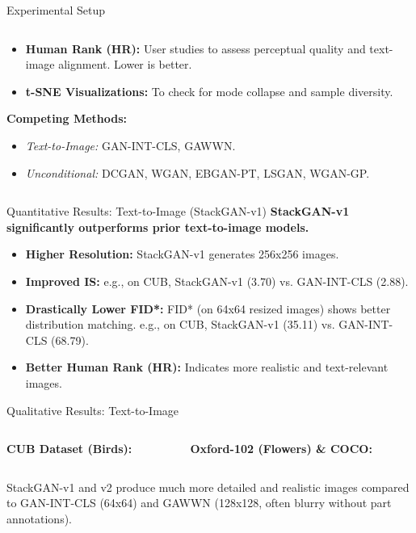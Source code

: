 \documentclass{beamer}
\newcommand{\paperfigure}[3][width=\textwidth]{%
    \begin{figure}%
        \centering%
        \texttt{[image: figures/\#2.png]}%
        \caption{#3 (Source:~\cite{stackgan++})}%
    \end{figure}%
}
\begin{document}
\begin{frame}{Experimental Setup}
\begin{columns}[T]
\begin{column}{0.5\textwidth}
\begin{itemize}
                \item \textbf{Human Rank (HR):} User studies to assess perceptual quality and text-image alignment. Lower is better.
                \item \textbf{t-SNE Visualizations:} To check for mode collapse and sample diversity.
            \end{itemize}
            \textbf{Competing Methods:}
            \begin{itemize}
                \item \textit{Text-to-Image:} GAN-INT-CLS, GAWWN.
                \item \textit{Unconditional:} DCGAN, WGAN, EBGAN-PT, LSGAN, WGAN-GP.
            \end{itemize}
        \end{column}
    \end{columns}
\end{frame}

\begin{frame}{Quantitative Results: Text-to-Image (StackGAN-v1)}
    \textbf{StackGAN-v1 significantly outperforms prior text-to-image models.}
    \begin{itemize}
        \item \textbf{Higher Resolution:} StackGAN-v1 generates 256x256 images.
        \item \textbf{Improved IS:} e.g., on CUB, StackGAN-v1 (3.70) vs. GAN-INT-CLS (2.88).
        \item \textbf{Drastically Lower FID*:} FID* (on 64x64 resized images) shows better distribution matching. e.g., on CUB, StackGAN-v1 (35.11) vs. GAN-INT-CLS (68.79).
        \item \textbf{Better Human Rank (HR):} Indicates more realistic and text-relevant images.
    \end{itemize}
\end{frame}

\begin{frame}{Qualitative Results: Text-to-Image}
    \begin{columns}[T]
        \begin{column}{0.5\textwidth}
            \textbf{CUB Dataset (Birds):}
        \end{column}
        \begin{column}{0.5\textwidth}
            \textbf{Oxford-102 (Flowers) \& COCO:}
        \end{column}
    \end{columns}
    \vspace{0.2cm}
    StackGAN-v1 and v2 produce much more detailed and realistic images compared to GAN-INT-CLS (64x64) and GAWWN (128x128, often blurry without part annotations).
\end{frame}
\end{document}
